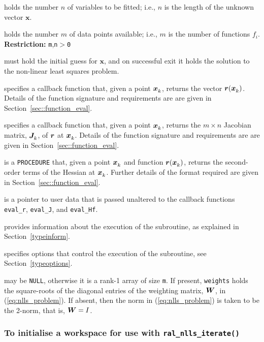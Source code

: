\documentclass{spec}
\begin{document}
\begin{description}
 holds the number $n$ of
variables to be fitted; i.e., $n$ is the length of the unknown vector $\bm x$.

 holds the number $m$ of
data points available; i.e., $m$ is the number of functions $f_i$.
\textbf{Restriction:} \texttt{m},\texttt{n}$>$\texttt{0}

 must hold the initial guess for $\bm x$, and on
successful exit it holds the solution to the non-linear least squares problem.

 specifies a callback function that, given a point ${\bm x}_{k}^{}$,
returns the vector ${\bm r}({\bm x}_{k}^{})$. Details of the function signature and
requirements are are given in Section~\ref{sec::function_eval}.

 specifies a callback function that, given a point ${\bm x}_{k}^{}$,
returns the $m \times n$ Jacobian matrix, ${\bm J}_{k}^{}$, of ${\bm r}$ at ${\bm x}_{k}^{}$. Details of the function signature and requirements are are given in
Section~\ref{sec::function_eval}.

 is a {\tt PROCEDURE} that, given a point ${\bm x}_{k}^{}$
and function ${\bm r}({\bm x}_{k}^{})$, returns the second-order terms of the Hessian at ${\bm x}_{k}^{}$.
Further details of the format required are given in Section~\ref{sec::function_eval}.

 is a pointer to user data that is passed unaltered to the callback
functions {\tt eval\_r}, {\tt eval\_J}, and {\tt eval\_Hf}.

 provides information about the execution
of the subroutine, as explained in Section~\ref{typeinform}.

 specifies options that control the execution of the subroutine,
see Section~\ref{typeoptions}.

 may be {\tt NULL}, otherwise it is a rank-1 array of size {\tt m}. If present, {\tt weights} holds the square-roots of the 
diagonal entries of the weighting matrix, ${\bm W}$, in (\ref{eq:nlls_problem}).  If absent, then the norm in (\ref{eq:nlls_problem}) is taken to be the 2-norm, that is, ${\bm W} = I$.
\end{description}

\subsubsection{To initialise a workspace for use with \texttt{ral\_nlls\_iterate()}}
\end{document}
